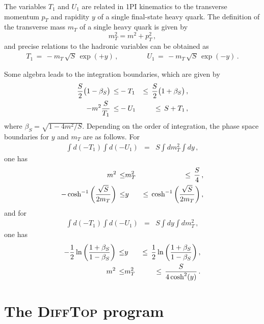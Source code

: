 \documentclass[11pt]{article}
\begin{document}
{The variables $T_1$ and $U_1$ are related in 1PI kinematics to 
the transverse momentum $p_T$ and rapidity $y$ of a single final-state heavy quark.
The definition of the transverse mass $m_T$ of a single heavy quark is given by 
\begin{equation}
\label{eq:mt2-1pi}
  m_T^2 =  m^2 + p_T^2\, ,
\end{equation}
and precise relations to the hadronic variables can be obtained as 
\begin{eqnarray}
T_1 \,=\, - m_T\, \sqrt{S}\,\exp(+y)\, ,  
\qquad\qquad 
U_1 \,=\, - m_T\,\sqrt{S}\,\exp(-y)\, .
\end{eqnarray}

Some algebra leads to the integration boundaries, which are given by  
\begin{eqnarray}
{S \over 2} \big(1 - \beta_S \big)   
\,\le& -T_1 &\le\, 
{S \over 2} \big(1 + \beta_S \big) \, , \\
- m^2 { S \over T_1}
\,\le& -U_1 &\le\, 
S + T_1\, ,
\end{eqnarray}
where $\beta_S=\sqrt{1-4m^2/S}$.
Depending on the order of integration, the phase space boundaries for
$y$ and $m_T$ are as follows.
For 
\begin{eqnarray}
\int d(-T_1) \int d(-U_1) &=& S \int d m_T^2 \int dy\, ,
  \label{eq:mty-1pi}
\end{eqnarray}
one has
\begin{eqnarray}
m^2 
\,\le& m_T^2 &\le\, 
{S \over 4} \, , 
\label{eq:mtybds-1-1pi}
\\
- \cosh^{-1}\bigg({ \sqrt{S} \over 2 m_T} \bigg)
\,\le& y &\le\, 
\cosh^{-1}\bigg({ \sqrt{S} \over 2 m_T} \bigg)\, ,
\label{eq:mtybds-2-1pi}
\end{eqnarray}
and for 
\begin{eqnarray}
\int d(-T_1) \int d(-U_1) &=& S \int d y \int d m_T^2\, ,
  \label{eq:ymt-1pi}
\end{eqnarray}
one has
\begin{eqnarray}
- {1 \over 2} \ln\bigg({1 + \beta_S \over 1 - \beta_S} \bigg)
\,\le& y &\le\, 
{1 \over 2} \ln\bigg({1 + \beta_S \over 1 - \beta_S} \bigg) \, ,
\label{eq:ymtbds-1-1pi}
\\
m^2 \,\le& m_T^2 &\le\, 
{S \over 4 \cosh^2(y)} \, .
\label{eq:ymtbds-2-1pi}
\end{eqnarray}





\section{The \textsc{DiffTop} program}\label{sec:The DiffTop program}


}
\end{document}
